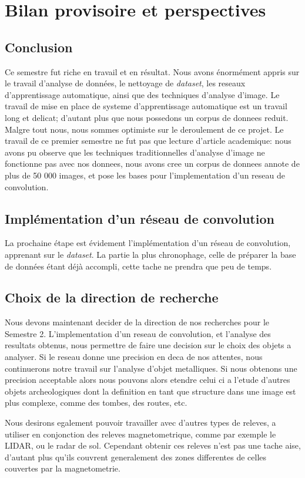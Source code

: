 \documentclass[a4paper, 12pt, titlepage, oneside, french]{article}
\begin{document}
\section{Bilan provisoire et perspectives}
	\subsection{Conclusion} %
	Ce semestre fut riche en travail et en résultat. Nous avons énormément appris sur le travail d'analyse de données, le nettoyage de \textit{dataset}, les reseaux d'apprentissage automatique, ainsi que des techniques d'analyse d'image. Le travail de mise en place de systeme d'apprentissage automatique est un travail long et delicat; d'autant plus que nous possedons un corpus de donnees reduit. Malgre tout nous, nous sommes optimiste sur le deroulement de ce projet. Le travail de ce premier semestre ne fut pas que lecture d'article academique: nous avons pu observe que les techniques traditionnelles d'analyse d'image ne fonctionne pas avec nos donnees, nous avons cree un corpus de donnees annote de plus de 50 000 images, et pose les bases pour l'implementation d'un reseau de convolution.
	\subsection{Implémentation d'un réseau de convolution}
	La prochaine étape est évidement l'implémentation d'un réseau de convolution, apprenant sur le \textit{dataset}. La partie la plus chronophage, celle de préparer la base de données étant déjà accompli, cette tache ne prendra que peu de temps. 
	\subsection{Choix de la direction de recherche}
	Nous devons maintenant decider de la direction de nos recherches pour le Semestre 2. L'implementation d'un reseau de convolution, et l'analyse des resultats obtenus, nous permettre de faire une decision sur le choix des objets a analyser. Si le reseau donne une precision en deca de nos attentes, nous continuerons notre travail sur l'analyse d'objet metalliques. Si nous obtenons une precision acceptable alors nous pouvons alors etendre celui ci a l'etude d'autres objets archeologiques dont la definition en tant que structure dans une image est plus complexe, comme des tombes, des routes, etc. 

	Nous desirons egalement pouvoir travailler avec d'autres types de releves, a utiliser en conjonction des releves magnetometrique, comme par exemple le LIDAR, ou le radar de sol. Cependant obtenir ces releves n'est pas une tache aise, d'autant plus qu'ils couvrent generalement des zones differentes de celles couvertes par la magnetometrie.
\end{document}
